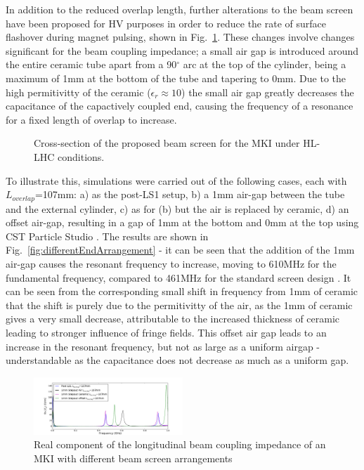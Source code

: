 \documentclass[a4paper,
              ]{jacow}
\begin{document}
In addition to the reduced overlap length, further alterations to the beam screen have been proposed for HV purposes in order to reduce the rate of surface flashover during magnet pulsing, shown in Fig.~\ref{fig:BeamScreenHLLHC}. These changes involve changes significant for the beam coupling impedance; a small air gap is introduced around the entire ceramic tube apart from a 90$^{\circ}$ arc at the top of the cylinder, being a maximum of 1mm at the bottom of the tube and tapering to 0mm. Due to the high permitivitty of the ceramic ($\epsilon_{r}\approx 10$) the small air gap greatly decreases the capacitance of the capactively coupled end, causing the frequency of a resonance for a fixed length of overlap to increase. 

\begin{figure}
\begin{center}
\caption{Cross-section of the proposed beam screen for the MKI under HL-LHC conditions.}
\label{fig:BeamScreenHLLHC}
\end{center}
\end{figure}

To illustrate this, simulations were carried out of the following cases, each with $L_{overlap}$=107mm: a) as the post-LS1 setup, b) a 1mm air-gap between the tube and the external cylinder, c) as for (b) but the air is replaced by ceramic, d) an offset air-gap, resulting in a gap of 1mm at the bottom and 0mm at the top using CST Particle Studio \cite{cst-cite}. The results are shown in Fig.~\ref{fig:differentEndArrangement} - it can be seen that the addition of the 1mm air-gap causes the resonant frequency to increase, moving to 610MHz for the fundamental frequency, compared to 461MHz for the standard screen design . It can be seen from the corresponding small shift in frequency from 1mm of ceramic that the shift is purely due to the permitivitty of the air, as the 1mm of ceramic gives a very small decrease, attributable to the increased thickness of ceramic leading to stronger influence of fringe fields. This offset air gap leads to an increase in the resonant frequency, but not as large as a uniform airgap - understandable as the capacitance does not decrease as much as a uniform gap.

\begin{figure}
\begin{center}
\includegraphics[width=0.5\textwidth]{differentScreenSpacings.pdf}
\caption{Real component of the longitudinal beam coupling impedance of an MKI with different beam screen arrangements}
\label{fig:differenEndArrangement}
\end{center}
\end{figure}
\end{document}
